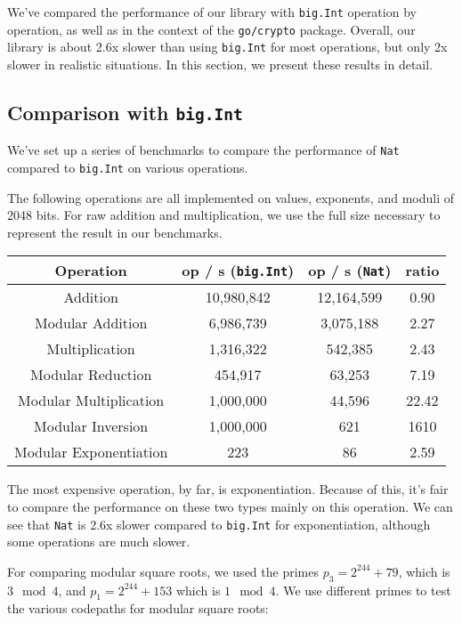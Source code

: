 \documentclass[11pt, a4paper]{article} %
\begin{document}
{We've compared the performance of our library
with \texttt{big.Int} operation by operation, as well as in the
context of the \texttt{go/crypto} package.
Overall, our library is about 2.6x slower than using
\texttt{big.Int} for most operations,
but only 2x slower in realistic situations.
In this section, we
present these results in detail.

\subsection{Comparison with \texttt{big.Int}}

We've set up a series of benchmarks to compare the performance
of \texttt{Nat} compared to \texttt{big.Int} on various operations.

The following operations are all implemented on values, exponents,
and moduli of 2048 bits. For raw addition and multiplication,
we use the full size necessary to represent the result in our benchmarks.

\begin{center}
 \begin{tabular}{|c | c | c | c|} 
 \hline
 Operation & op / s (\texttt{big.Int}) & op / s (\texttt{Nat}) & ratio \\ [0.5ex] 
 \hline\hline
 Addition & 10,980,842 & 12,164,599 & 0.90 \\
 \hline
 Modular Addition & 6,986,739 & 3,075,188 & 2.27 \\
 \hline
 Multiplication & 1,316,322 & 542,385 & 2.43 \\
 \hline
 Modular Reduction & 454,917 & 63,253 & 7.19 \\
 \hline
 Modular Multiplication & 1,000,000 & 44,596 & 22.42 \\
 \hline
 Modular Inversion & 1,000,000 & 621 & 1610 \\
 \hline
 Modular Exponentiation & 223 & 86 & 2.59 \\
 \hline
\end{tabular}
\end{center}

The most expensive operation, by far, is exponentiation. Because
of this, it's fair to compare the performance on these two types
mainly on this operation. We can see that \texttt{Nat} is 2.6x slower
compared to \texttt{big.Int} for exponentiation, although
some operations are much slower.

For comparing modular square roots, we used the primes
$p_3 = 2^{244} + 79$, which is $3 \mod 4$,
and $p_1 = 2^{244} + 153$ which is $1 \mod 4$. We use different primes
to test the various codepaths for modular square roots:

}
\end{document}
